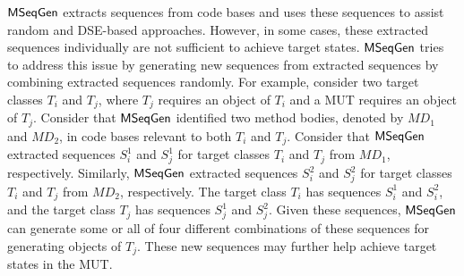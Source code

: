 \documentclass{sig-alternate}
\begin{document}
$\textsf{MSeqGen} $ extracts sequences from code bases and uses these sequences to assist random and DSE-based approaches. However, in some cases, these extracted sequences individually are not sufficient to achieve target states. $\textsf{MSeqGen} $ tries to address this issue by generating new sequences from extracted sequences by combining extracted sequences randomly. For example, consider two target classes $T_i$ and $T_j$, where $T_j$ requires an object of $T_i$ and a MUT requires an object of $T_j$. Consider that $\textsf{MSeqGen} $ identified two method bodies, denoted by $MD_1$ and $MD_2$, in code bases relevant to both $T_i$ and $T_j$. Consider that $\textsf{MSeqGen} $ extracted sequences $S_i^1$ and $S_j^1$ for target classes $T_i$ and $T_j$ from $MD_1$, respectively. Similarly, $\textsf{MSeqGen} $ extracted sequences $S_i^2$ and $S_j^2$ for target classes $T_i$ and $T_j$ from $MD_2$, respectively. The target class $T_i$ has sequences $S_i^1$ and $S_i^2$, and the target class $T_j$ has sequences $S_j^1$ and $S_j^2$. Given these sequences, $\textsf{MSeqGen} $ can generate some or all of four different combinations of these sequences for generating objects of $T_j$. These new sequences may further help achieve target states in the MUT.

\end{document}
